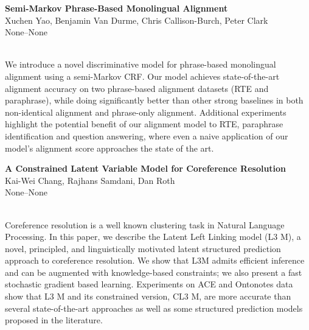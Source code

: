 \documentclass[twoside,makeidx]{book}
\renewcommand{\normalsize}{\fontsize{8}{9}\selectfont}
\renewcommand{\small}{\fontsize{7}{8}\selectfont}
\begin{document}
\par\vspace{2em}\noindent%
\begin{minipage}{\linewidth}%
\begin{center}
\textbf{\normalsize Semi-Markov Phrase-Based Monolingual Alignment}\\
\normalsize  Xuchen Yao,  Benjamin Van Durme,  Chris Callison-Burch,  Peter Clark\\
{\small None--None}\\
\end{center}
\end{minipage}\\[0.5em]
\nopagebreak%
\noindent%
{\small We introduce a novel discriminative model for phrase-based monolingual alignment using a semi-Markov CRF. Our model achieves state-of-the-art alignment accuracy on two phrase-based alignment datasets (RTE and paraphrase), while doing significantly better than other strong baselines in both non-identical alignment and phrase-only alignment. Additional experiments highlight the potential benefit of our alignment model to RTE, paraphrase identification and question answering, where even a naive application of our model's alignment score approaches the state of the art.}
\par\vspace{2em}\noindent%
\begin{minipage}{\linewidth}%
\begin{center}
\textbf{\normalsize A Constrained Latent Variable Model for Coreference Resolution}\\
\normalsize  Kai-Wei Chang,  Rajhans Samdani,  Dan Roth\\
{\small None--None}\\
\end{center}
\end{minipage}\\[0.5em]
\nopagebreak%
\noindent%
{\small Coreference resolution is a well known clustering task in Natural Language Processing. In this paper, we describe the Latent Left Linking model (L3 M), a novel, principled, and linguistically motivated latent structured prediction approach to coreference resolution. We show that L3M admits efficient inference and can be augmented with knowledge-based constraints; we also present a fast stochastic gradient based learning. Experiments on ACE and Ontonotes data show that L3 M and its constrained version, CL3 M, are more accurate than several state-of-the-art approaches as well as some structured prediction models proposed in the literature.}
\end{document}
